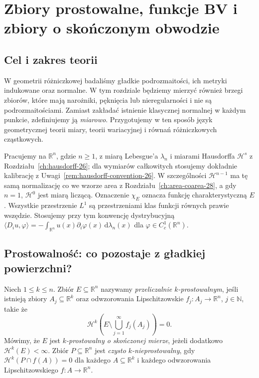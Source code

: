 \chapter[Prostowalność i zbiory o skończonym obwodzie]{Zbiory prostowalne, funkcje BV i zbiory o skończonym obwodzie}
\label{ch:geometric-measure-29}

\section{Cel i zakres teorii}
W geometrii różniczkowej badaliśmy gładkie podrozmaitości, ich
metryki indukowane oraz normalne. W tym rozdziale będziemy mierzyć
również brzegi zbiorów, które mają narożniki, pęknięcia lub
nieregularności i nie są podrozmaitościami. Zamiast zakładać
istnienie klasycznej normalnej w każdym punkcie, zdefiniujemy ją
\emph{miarowo}. Przygotujemy w ten sposób język geometrycznej
teorii miary, teorii wariacyjnej i równań różniczkowych cząstkowych.

Pracujemy na $\mathbb R^n$, gdzie $n\ge1$, z miarą Lebesgue'a
$\lambda_n$ i miarami Hausdorffa $\mathcal H^s$
z Rozdziału~\ref{ch:hausdorff-26}; dla wymiarów
całkowitych stosujemy dokładnie kalibrację
z Uwagi~\ref{rem:hausdorff-convention-26}.
W szczególności $\mathcal H^{n-1}$ ma tę samą
normalizację co we wzorze area z
Rozdziału~\ref{ch:area-coarea-28}, a gdy $n=1$,
$\mathcal H^0$ jest miarą liczącą. Oznaczenie $\chi_E$ oznacza
funkcję charakterystyczną $E$. Wszystkie przestrzenie $L^1$
są przestrzeniami klas funkcji równych prawie wszędzie.
Stosujemy przy tym konwencję dystrybucyjną
$\langle D_i u,\varphi\rangle=-\int_{\mathbb R^n}u(x)
\partial_i\varphi(x)\,\mathrm d\lambda_n(x)$ dla
$\varphi\in C_c^1(\mathbb R^n)$.

\section{Prostowalność: co pozostaje z gładkiej powierzchni?}
\begin{definicja}
\label{def:rectifiable-29}
Niech $1\le k\le n$. Zbiór $E\subseteq\mathbb R^n$ nazywamy
\emph{przeliczalnie $k$-prostowalnym}, jeśli istnieją
zbiory $A_j\subseteq\mathbb R^k$ oraz odwzorowania
Lipschitzowskie $f_j:A_j\to\mathbb R^n$, $j\in\mathbb N$,
takie że
\[
 \mathcal H^k\!\left(E\setminus\bigcup_{j=1}^\infty f_j(A_j)\right)=0.
\]
Mówimy, że $E$ jest \emph{$k$-prostowalny o skończonej mierze},
jeżeli dodatkowo $\mathcal H^k(E)<\infty$.
Zbiór $P\subseteq\mathbb R^n$ jest \emph{czysto
$k$-nieprostowalny}, gdy
$\mathcal H^k(P\cap f(A))=0$ dla każdego
$A\subseteq\mathbb R^k$ i każdego odwzorowania
Lipschitzowskiego $f:A\to\mathbb R^n$.
\end{definicja}

